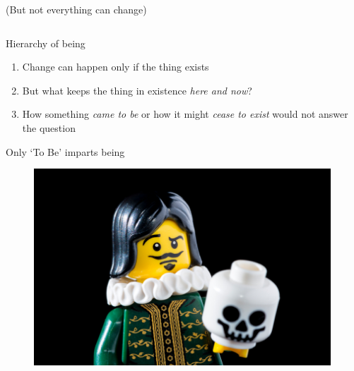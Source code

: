 \documentclass[xcolor=dvipsnames]{beamer}
\begin{document}
\begin{frame}{(But not everything can change)}
\begin{figure}
\begin{columns}
  \end{columns}
\end{figure}
\end{frame}


\begin{frame}[fragile]{Hierarchy of being}
  \begin{enumerate}
  \item Change can happen only if the thing exists \vspace{5mm}
  \item But what keeps the thing in existence \emph{here and now}? \vspace{5mm}
  \item How something \emph{came to be} or how it might \emph{cease to exist} would not answer the question \vspace{5mm}
  \end{enumerate}
\end{frame}


\begin{frame}{Only `To Be' imparts being}
\begin{figure}
  \centering
  \begin{columns}
    \centering
    \includegraphics[width=0.99\textwidth]{to_be}
  \end{columns}
\end{figure}
\end{frame}
\end{document}

